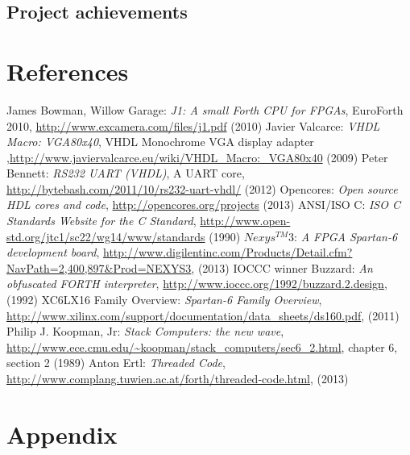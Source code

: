 \documentclass	[a4paper, 10pt]	{article}
\begin{document}
    \subsection{Project achievements}
  \section{References}

    \begin{thebibliography}{1}              %
     James Bowman, Willow Garage: \emph{J1: A small Forth CPU for FPGAs},  EuroForth 2010, \url{http://www.excamera.com/files/j1.pdf} (2010)
     Javier Valcarce: \emph{VHDL Macro: VGA80x40}, VHDL Monochrome VGA display adapter ,\url{http://www.javiervalcarce.eu/wiki/VHDL_Macro:_VGA80x40} (2009)
     Peter Bennett: \emph{RS232 UART (VHDL)}, A UART core, \url{http://bytebash.com/2011/10/rs232-uart-vhdl/} (2012)
     Opencores: \emph{Open source HDL cores and code}, \url{http://opencores.org/projects} (2013)
     ANSI/ISO C: \emph{ISO C Standards Website for the C Standard}, \url{http://www.open-std.org/jtc1/sc22/wg14/www/standards} (1990)
     $Nexys^{TM}$3: \emph{A FPGA Spartan-6 development board}, \url{http://www.digilentinc.com/Products/Detail.cfm?NavPath=2,400,897\&Prod=NEXYS3}, (2013)
     IOCCC winner Buzzard: \emph{An obfuscated FORTH interpreter}, \url{http://www.ioccc.org/1992/buzzard.2.design}, (1992)
     XC6LX16 Family Overview: \emph{Spartan-6 Family Overview}, \url{http://www.xilinx.com/support/documentation/data_sheets/ds160.pdf}, (2011)
     Philip J. Koopman, Jr: \emph{Stack Computers: the new wave}, \url{http://www.ece.cmu.edu/~koopman/stack_computers/sec6_2.html}, chapter 6, section 2 (1989)
     Anton Ertl: \emph{Threaded Code}, \url{http://www.complang.tuwien.ac.at/forth/threaded-code.html}, (2013)
    \end{thebibliography}



  \section{Appendix}
\end{document}
